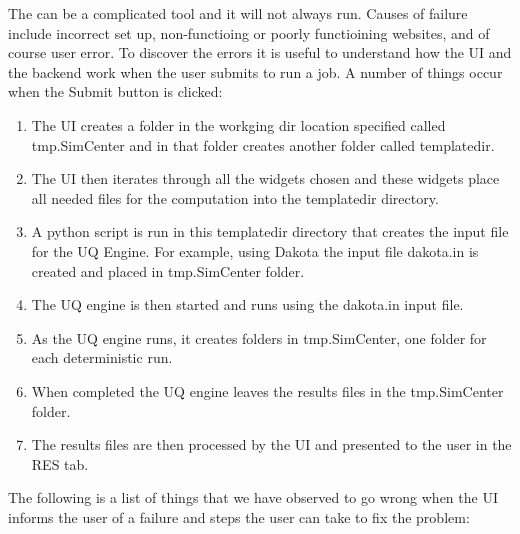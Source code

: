 The \texttt{\getsoftwarename{}} can be a complicated tool and it will not always run. Causes of failure include incorrect set up, non-functioing or poorly functioining websites, and of course user error. To discover the errors it is useful to understand how the UI and the backend work when the user submits to run a job. A number of things occur when the Submit button is clicked: 

\begin{enumerate}
\item The UI creates a folder in the workging dir location specified called tmp.SimCenter and in that folder creates another folder called templatedir.
\item The UI then iterates through all the widgets chosen and these widgets place all needed files for the computation into the templatedir directory.
\item A python script is run in this templatedir directory that creates the input file for the UQ Engine. For example, using Dakota the input file dakota.in is created and placed in tmp.SimCenter folder.
\item The UQ engine is then started and runs using the dakota.in input file.
\item As the UQ engine runs, it creates folders in tmp.SimCenter, one folder for each deterministic run.
\item When completed the UQ engine leaves the results files in the tmp.SimCenter folder.
\item The results files are then processed by the UI and presented to the user in the RES tab.
\end{enumerate}

The following is a list of things that we have observed to go wrong when the UI informs the user of a failure and steps the user can take to fix the problem:  

